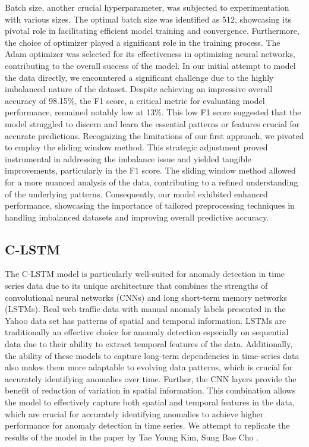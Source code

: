 \documentclass[10pt,twocolumn,letterpaper]{article}
\begin{document}
Batch size, another crucial hyperparameter, was subjected to experimentation with various sizes. The optimal batch size was identified as 512, showcasing its pivotal role in facilitating efficient model 
training and convergence. Furthermore, the choice of optimizer played a significant role in the training process. The Adam optimizer was selected for its effectiveness in optimizing neural networks, 
contributing to the overall success of the model.
In our initial attempt to model the data directly, we encountered a significant challenge due to the highly imbalanced nature of the dataset. 
Despite achieving an impressive overall accuracy of 98.15\%, the F1 score, a critical metric for evaluating model performance, remained notably low at 13\%. This low F1 score suggested that the model 
struggled to discern and learn the essential patterns or features crucial for accurate predictions.
Recognizing the limitations of our first approach, we pivoted to employ the sliding window method. This strategic adjustment proved instrumental in addressing the imbalance issue and yielded 
tangible improvements, particularly in the F1 score. The sliding window method allowed for a more nuanced analysis of the data, contributing to a refined understanding of the underlying patterns. 
Consequently, our model exhibited enhanced performance, showcasing the importance of tailored preprocessing techniques in handling imbalanced datasets and improving overall predictive accuracy.


\subsection{C-LSTM}
The C-LSTM model is particularly well-suited for anomaly detection in time series data due to its unique architecture that combines the strengths of convolutional neural networks (CNNs) and 
long short-term memory networks (LSTMs). Real web traffic data with manual anomaly labels presented in the Yahoo data set has patterns of spatial and temporal information. LSTMs are traditionally an 
effective choice for anomaly detection especially on sequential data due to their ability to extract temporal features of the data. Additionally, the ability of these models to capture long-term dependencies 
in time-series data also makes them more adaptable to evolving data patterns, which is crucial for accurately identifying anomalies over time. Further, the CNN layers provide the benefit of reduction of 
variation in spatial information.  This combination allows the model to effectively capture both spatial and temporal features in the data, which are crucial for accurately identifying anomalies \cite{kim2018web} to 
achieve higher performance for anomaly detection in time series. We attempt to replicate the results of the model in the paper by Tae Young Kim, Sung Bae Cho \cite{kim2018web}.
\end{document}
